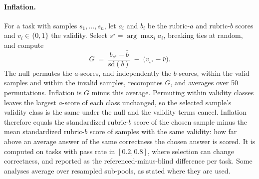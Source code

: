 \paragraph{Inflation.}
For a task with samples $s_1,\dots,s_n$, let $a_i$ and $b_i$ be the rubric-$a$ and rubric-$b$ scores and $v_i \in \{0,1\}$ the validity. Select $s^\star = \arg\max_i a_i$, breaking ties at random, and compute
\begin{equation}
G \;=\; \frac{b_{s^\star}-\bar b}{\mathrm{sd}(b)} \;-\; \bigl(v_{s^\star}-\bar v\bigr).
\label{eq:gap}
\end{equation}
The null permutes the $a$-scores, and independently the $b$-scores, within the valid samples and within the invalid samples, recomputes $G$, and averages over 50 permutations. Inflation is $G$ minus this average. Permuting within validity classes leaves the largest $a$-score of each class unchanged, so the selected sample's validity class is the same under the null and the validity terms cancel. Inflation therefore equals the standardized rubric-$b$ score of the chosen sample minus the mean standardized rubric-$b$ score of samples with the same validity: how far above an average answer of the same correctness the chosen answer is scored. It is computed on tasks with pass rate in $[0.2, 0.8]$, where selection can change correctness, and reported as the referenced-minus-blind difference per task. Some analyses average over resampled sub-pools, as stated where they are used.

